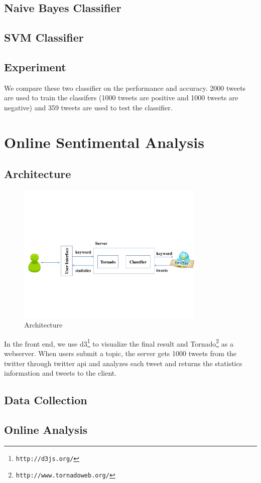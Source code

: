 \documentclass{article}
\begin{document}
\subsection{Naive Bayes Classifier}
\subsection{SVM Classifier}
\subsection{Experiment}
We compare these two classifier on the performance and accuracy. 2000 tweets are used to train the classifers (1000 tweets are positive and 1000 tweets are negative) and 359 tweets are used to test the classifier.
\section{Online Sentimental Analysis}
\subsection{Architecture}
\begin{figure}
\centering
\includegraphics[width=0.8\textwidth]{pics/architecture}
\caption{Architecture}
\label{Fig:architecture}
\end{figure}
In the front end, we use d3\footnote{\texttt{\scriptsize{http://d3js.org/‎‎}}} to visualize the final result and Tornado\footnote{\texttt{\scriptsize{http://www.tornadoweb.org/}}} as a webserver. When users submit a topic, the server gets 1000 tweets from the twitter through twitter api and analyzes each tweet and returns the statistics information and tweets to the client. 
\subsection{Data Collection}

\subsection{Online Analysis}
\end{document}
